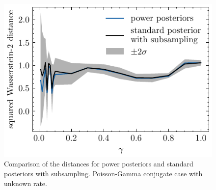 \documentclass[12pt]{article}
\begin{document}
\FloatBarrier
\begin{figure}
\begin{center}
\includegraphics{imgs/poisson_gamma_subsample3.pdf}
\end{center}
\caption{Comparison of the distances for power posteriors and standard posteriors with subsampling. Poisson-Gamma conjugate case with unknown rate.}\label{fig:poisson_gamma_sub}
\end{figure}
\end{document}
